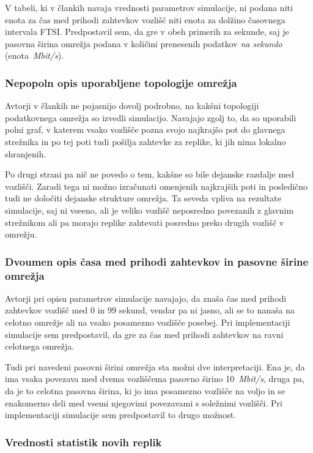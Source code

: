 \documentclass[a4paper, 12pt]{book}
\begin{document}
V tabeli, ki v člankih navaja vrednosti parametrov simulacije, ni podana
niti enota za čas med prihodi zahtevkov vozlišč niti enota za dolžino
časovnega intervala FTSI. Predpostavil sem, da gre v obeh primerih za sekunde,
saj je pasovna širina omrežja podana v količini prenesenih podatkov
\textit{na sekundo} (enota~\textit{Mbit/s}).

\subsubsection{Nepopoln opis uporabljene topologije omrežja}

Avtorji v člankih ne pojasnijo dovolj podrobno, na kakšni topologiji
podatkovnega omrežja so izvedli simulacijo. Navajajo zgolj to, da so uporabili
polni graf, v katerem vsako vozlišče pozna svojo najkrajšo pot do glavnega
strežnika in po tej poti tudi pošilja zahtevke za replike, ki jih nima lokalno
shranjenih.

Po drugi strani pa nič ne povedo o tem, kakšne so bile dejanske
razdalje med vozlišči. Zaradi tega ni možno izračunati omenjenih
najkrajših poti in posledično tudi ne določiti dejanske strukture omrežja.
Ta seveda vpliva na rezultate simulacije, saj ni vseeno, ali je veliko
vozlišč neposredno povezanih z glavnim strežnikom ali pa morajo replike
zahtevati posredno preko drugih vozlišč v omrežju.

\subsubsection{Dvoumen opis časa med prihodi zahtevkov in pasovne širine
omrežja}

Avtorji pri opisu parametrov simulacije navajajo, da znaša čas med prihodi
zahtevkov vozlišč med 0 in 99 sekund, vendar pa ni jasno, ali se to nanaša
na celotno omrežje ali na vsako posamezno vozlišče posebej. Pri implementaciji
simulacije sem predpostavil, da gre za čas med prihodi zahtevkov na ravni
celotnega omrežja.

Tudi pri navedeni pasovni širini omrežja sta možni dve interpretaciji. Ena je,
da ima vsaka povezava med dvema vozliščema pasovno širino 10~\textit{Mbit/s},
druga pa, da je to celotna pasovna širina, ki jo ima posamezno vozlišče na
voljo in se enakomerno deli med vsemi njegovimi povezavami s soležnimi
vozlišči. Pri implementaciji simulacije sem predpostavil to drugo možnost.

\subsubsection{Vrednosti statistik novih replik}
\end{document}
